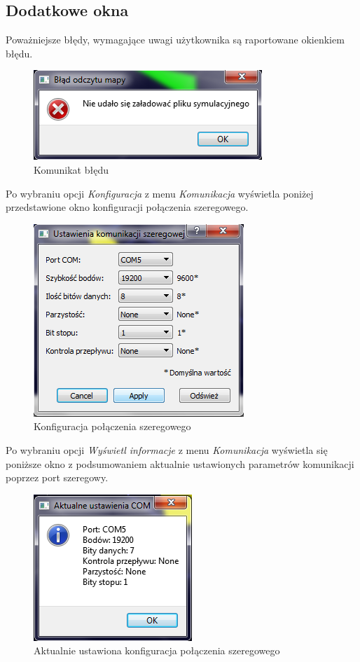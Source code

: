 \documentclass[a4paper]{article}
\begin{document}
\subsection{Dodatkowe okna}
Poważniejsze błędy, wymagające uwagi użytkownika są raportowane okienkiem błędu. 
\begin{figure} [H]
\centering
\includegraphics{error_screen.png}
\caption{Komunikat błędu}
\label{error_screen}
\end{figure}
Po wybraniu opcji \textit{Konfiguracja} z menu \textit{Komunikacja} wyświetla poniżej przedstawione okno konfiguracji połączenia szeregowego. 
\begin{figure} [H]
\centering
\includegraphics{app3.png}
\caption{Konfiguracja połączenia szeregowego}
\label{app3}
\end{figure}
Po wybraniu opcji \textit{Wyświetl informacje} z menu \textit{Komunikacja} wyświetla się poniższe okno z podsumowaniem aktualnie ustawionych parametrów komunikacji poprzez port szeregowy. 
\begin{figure} [H]
\centering
\includegraphics{app6_small.png}
\caption{Aktualnie ustawiona konfiguracja połączenia szeregowego}
\label{app6}
\end{figure}
\end{document}
